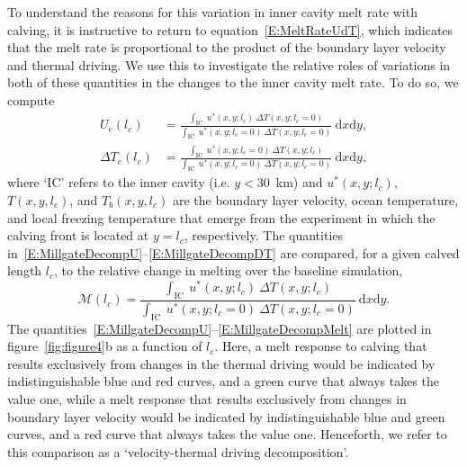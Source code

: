 \documentclass[draft]{agujournal2019}
\begin{document}
To understand the reasons for this variation in inner cavity melt rate with calving, it is instructive to return to equation~\eqref{E:MeltRateUdT}, which indicates that the melt rate is proportional to the product of the boundary layer velocity and thermal driving. We use this to investigate the relative roles of variations in both of these quantities in the changes to the inner cavity melt rate. To do so, we compute~\cite{Millgate2013JGROceans}
 \begin{align}
U_{e}(l_c) &=  \frac{\int_{\text{IC}}~u^*(x,y; l_c)~\Delta T(x,y;l_c = 0)}{\int_{\text{IC}}~ u^*(x,y; l_c = 0)~\Delta T(x,y;l_c = 0)}~\mathrm{d}x\mathrm{d}y, \label{E:MillgateDecompU}\\ \Delta T_{e}(l_c) &=  \frac{\int_{\text{IC}}~u^*(x,y; l_c=0)~\Delta T(x,y;l_c)}{\int_{\text{IC}}~ u^*(x,y; l_c = 0)~\Delta T(x,y;l_c = 0)}~\mathrm{d}x\mathrm{d}y, \label{E:MillgateDecompDT}
 \end{align}
where `IC' refers to the inner cavity (i.e. $y < 30$~km) and $u^*(x,y;l_c)$, $T(x,y,l_c)$, and $T_b(x,y,l_c)$ are the boundary layer velocity, ocean temperature, and local freezing temperature that emerge from the experiment in which the calving front is located at $y = l_c$, respectively. The quantities in~\eqref{E:MillgateDecompU}--\eqref{E:MillgateDecompDT} are compared, for a given calved length $l_c$, to the relative change in melting over the baseline simulation,
 \begin{equation}\label{E:MillgateDecompMelt}
   \mathcal{M}(l_c) =  \frac{\int_{\text{IC}}~u^*(x,y; l_c)~\Delta T(x,y;l_c)}{\int_{\text{IC}}~ u^*(x,y; l_c = 0)~\Delta T(x,y;l_c = 0)}~\mathrm{d}x\mathrm{d}y.
 \end{equation}
The quantities~\eqref{E:MillgateDecompU}--\eqref{E:MillgateDecompMelt} are plotted in figure~\ref{fig:figure4}b as a function of $l_c$.  Here, a melt response to calving that results exclusively from changes in the thermal driving would be indicated by indistinguishable blue and red curves, and a green curve that always takes the value one, while a melt response that results exclusively from changes in boundary layer velocity would be indicated by indistinguishable blue and green curves, and a red curve that always takes the value one. Henceforth, we refer to this comparison as a `velocity-thermal driving decomposition'. %
\end{document}

